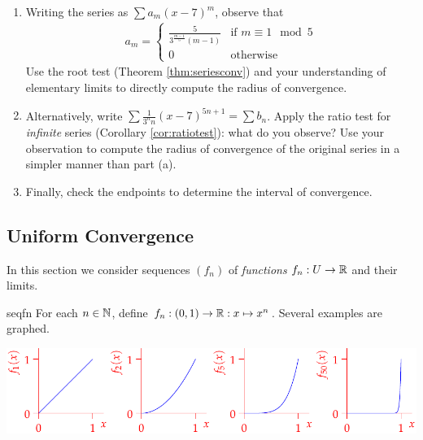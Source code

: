 \begin{exercises}
\begin{enumerate}
\begin{enumerate}
		  \item Writing the series as $\sum a_m(x-7)^m$, observe that
		  \begin{gather*}
				a_m=\begin{cases}
				\frac 5{3^{\frac{m-1}5}(m-1)}&\text{if $m\equiv 1\mod 5$}\\
				0&\text{otherwise}
			\end{cases}%
			\end{gather*}
		  Use the root test (Theorem \ref{thm:seriesconv}) and your understanding of elementary limits to directly compute the radius of convergence.
		  
		  \item Alternatively, write $\sum \frac{1}{3^nn}(x-7)^{5n+1}=\sum b_n$. Apply the ratio test for \emph{infinite} series (Corollary \ref{cor:ratiotest}): what do you observe? Use your observation to compute the radius of convergence of the original series in a simpler manner than part (a).
		  
		  \item Finally, check the endpoints to determine the interval of convergence.
		\end{enumerate}
		
	\end{enumerate}
\end{exercises}


\clearpage


\subsection{Uniform Convergence}\label{sec:uniformconv}

In this section we consider sequences $(f_n)$ of \emph{functions} $f_n:U\to\mathbb{R}$ and their limits.

\begin{example}{}{seqfn}
	For each $n\in\mathbb{N}$, define $f_n:(0,1)\to\mathbb{R}:x\mapsto x^n$. Several examples are graphed.
	\begin{center}
		\includegraphics{seqex1}
	\end{center}
\end{example}


